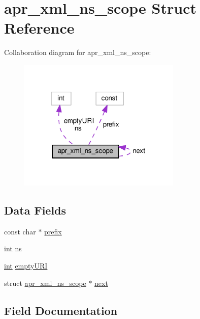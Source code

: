 \hypertarget{structapr__xml__ns__scope}{}\section{apr\+\_\+xml\+\_\+ns\+\_\+scope Struct Reference}
\label{structapr__xml__ns__scope}


Collaboration diagram for apr\+\_\+xml\+\_\+ns\+\_\+scope\+:
\nopagebreak
\begin{figure}[H]
\begin{center}
\leavevmode
\includegraphics[width=220pt]{structapr__xml__ns__scope__coll__graph}
\end{center}
\end{figure}
\subsection*{Data Fields}
\begin{DoxyCompactItemize}
\item 
const char $\ast$ \hyperlink{structapr__xml__ns__scope_a056c58d0181b445b71bf830adb8d234a}{prefix}
\item 
\hyperlink{pcre_8txt_a42dfa4ff673c82d8efe7144098fbc198}{int} \hyperlink{structapr__xml__ns__scope_a2d2f6a6f48e5d9ab54092a8f1c7ee298}{ns}
\item 
\hyperlink{pcre_8txt_a42dfa4ff673c82d8efe7144098fbc198}{int} \hyperlink{structapr__xml__ns__scope_ae1ad63d02e18e0124707c818e6d55cd4}{empty\+U\+RI}
\item 
struct \hyperlink{structapr__xml__ns__scope}{apr\+\_\+xml\+\_\+ns\+\_\+scope} $\ast$ \hyperlink{structapr__xml__ns__scope_a12dfdbc4ab84eac78d8d1bde7d23f78f}{next}
\end{DoxyCompactItemize}


\subsection{Field Documentation}
